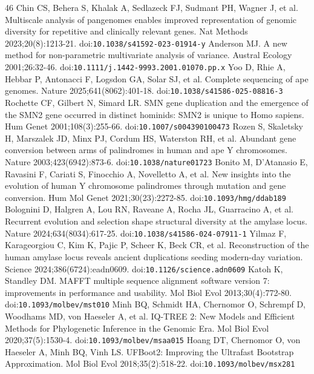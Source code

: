 \begin{thebibliography}{46}
 Chin CS, Behera S, Khalak A, Sedlazeck FJ, Sudmant PH, Wagner J, et al. Multiscale analysis of pangenomes enables improved representation of genomic diversity for repetitive and clinically relevant genes. Nat Methods 2023;20(8):1213-21. doi:\nolinkurl{10.1038/s41592-023-01914-y}
 Anderson MJ. A new method for non-parametric multivariate analysis of variance. Austral Ecology 2001;26:32-46. doi:\nolinkurl{10.1111/j.1442-9993.2001.01070.pp.x}
 Yoo D, Rhie A, Hebbar P, Antonacci F, Logsdon GA, Solar SJ, et al. Complete sequencing of ape genomes. Nature 2025;641(8062):401-18. doi:\nolinkurl{10.1038/s41586-025-08816-3}
 Rochette CF, Gilbert N, Simard LR. SMN gene duplication and the emergence of the SMN2 gene occurred in distinct hominids: SMN2 is unique to Homo sapiens. Hum Genet 2001;108(3):255-66. doi:\nolinkurl{10.1007/s004390100473}
 Rozen S, Skaletsky H, Marszalek JD, Minx PJ, Cordum HS, Waterston RH, et al. Abundant gene conversion between arms of palindromes in human and ape Y chromosomes. Nature 2003;423(6942):873-6. doi:\nolinkurl{10.1038/nature01723}
 Bonito M, D'Atanasio E, Ravasini F, Cariati S, Finocchio A, Novelletto A, et al. New insights into the evolution of human Y chromosome palindromes through mutation and gene conversion. Hum Mol Genet 2021;30(23):2272-85. doi:\nolinkurl{10.1093/hmg/ddab189}
 Bolognini D, Halgren A, Lou RN, Raveane A, Rocha JL, Guarracino A, et al. Recurrent evolution and selection shape structural diversity at the amylase locus. Nature 2024;634(8034):617-25. doi:\nolinkurl{10.1038/s41586-024-07911-1}
 Yilmaz F, Karageorgiou C, Kim K, Pajic P, Scheer K, Beck CR, et al. Reconstruction of the human amylase locus reveals ancient duplications seeding modern-day variation. Science 2024;386(6724):eadn0609. doi:\nolinkurl{10.1126/science.adn0609}
 Katoh K, Standley DM. MAFFT multiple sequence alignment software version 7: improvements in performance and usability. Mol Biol Evol 2013;30(4):772-80. doi:\nolinkurl{10.1093/molbev/mst010}
 Minh BQ, Schmidt HA, Chernomor O, Schrempf D, Woodhams MD, von Haeseler A, et al. IQ-TREE 2: New Models and Efficient Methods for Phylogenetic Inference in the Genomic Era. Mol Biol Evol 2020;37(5):1530-4. doi:\nolinkurl{10.1093/molbev/msaa015}
 Hoang DT, Chernomor O, von Haeseler A, Minh BQ, Vinh LS. UFBoot2: Improving the Ultrafast Bootstrap Approximation. Mol Biol Evol 2018;35(2):518-22. doi:\nolinkurl{10.1093/molbev/msx281}

\end{thebibliography}
